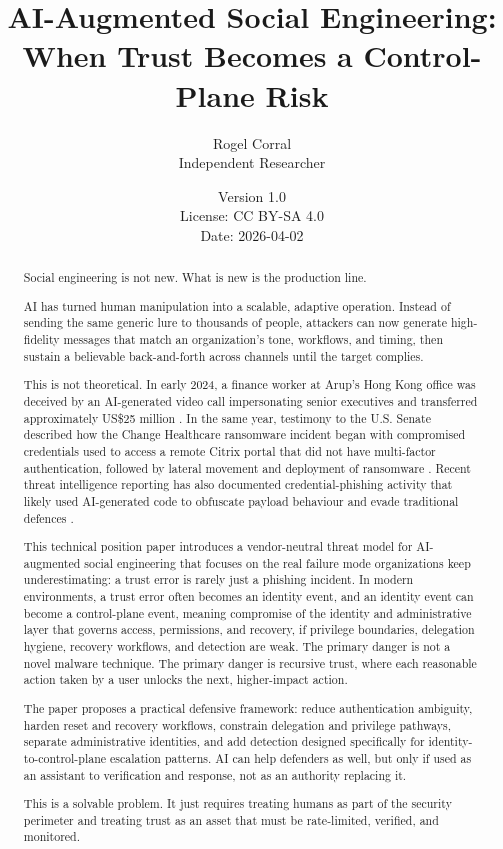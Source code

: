 \documentclass[11pt]{article}
\title{AI-Augmented Social Engineering: When Trust Becomes a Control-Plane Risk}
\author{Rogel Corral\\Independent Researcher}
\date{Version 1.0\\License: CC BY-SA 4.0\\Date: 2026-04-02}
\begin{document}
\maketitle

\begin{abstract}
Social engineering is not new. What is new is the production line.

AI has turned human manipulation into a scalable, adaptive operation. Instead of sending the same generic lure to thousands of people, attackers can now generate high-fidelity messages that match an organization’s tone, workflows, and timing, then sustain a believable back-and-forth across channels until the target complies.

This is not theoretical. In early 2024, a finance worker at Arup’s Hong Kong office was deceived by an AI-generated video call impersonating senior executives and transferred approximately US\$25 million \cite{milmo2024}. In the same year, testimony to the U.S. Senate described how the Change Healthcare ransomware incident began with compromised credentials used to access a remote Citrix portal that did not have multi-factor authentication, followed by lateral movement and deployment of ransomware \cite{witty2024}. Recent threat intelligence reporting has also documented credential-phishing activity that likely used AI-generated code to obfuscate payload behaviour and evade traditional defences \cite{microsoft2025}.

This technical position paper introduces a vendor-neutral threat model for AI-augmented social engineering that focuses on the real failure mode organizations keep underestimating: a trust error is rarely just a phishing incident. In modern environments, a trust error often becomes an identity event, and an identity event can become a control-plane event, meaning compromise of the identity and administrative layer that governs access, permissions, and recovery, if privilege boundaries, delegation hygiene, recovery workflows, and detection are weak. The primary danger is not a novel malware technique. The primary danger is recursive trust, where each reasonable action taken by a user unlocks the next, higher-impact action.

The paper proposes a practical defensive framework: reduce authentication ambiguity, harden reset and recovery workflows, constrain delegation and privilege pathways, separate administrative identities, and add detection designed specifically for identity-to-control-plane escalation patterns. AI can help defenders as well, but only if used as an assistant to verification and response, not as an authority replacing it.

This is a solvable problem. It just requires treating humans as part of the security perimeter and treating trust as an asset that must be rate-limited, verified, and monitored.
\end{abstract}
\end{document}
